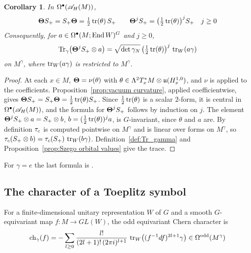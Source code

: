 \documentclass[11pt]{amsart}
\theoremstyle{plain}
\newtheorem{corollary}[theorem]{Corollary}
\theoremstyle{definition}
\theoremstyle{remark}
\begin{document}
\begin{corollary}\label{cor:vacuum curvature}
In $\Omega^\bullet({\mathscr{A}}_H(M))$,
\[ \boldsymbol{\Theta} S_+=S_+\boldsymbol{\Theta}=\tfrac12\operatorname{tr}(\theta)\,S_+\qquad \boldsymbol{\Theta}^jS_+=\bigl(\tfrac12\operatorname{tr}(\theta)\bigr)^jS_+\quad j\ge0\]
Consequently, for $a\in\Omega^\bullet(M;\operatorname{End} W)^G$ and $j\ge0$,
\[ \operatorname{Tr}_\gamma\bigl(\boldsymbol{\Theta}^jS_+\otimes a\bigr)=\sqrt{\det\gamma_N}\,\bigl(\tfrac12\operatorname{tr}(\theta)\bigr)^j\,\operatorname{tr}_W(a\gamma)\]
on $M^\gamma$, where $\operatorname{tr}_W(a\gamma)$ is restricted to $M^\gamma$.
\end{corollary}
\begin{proof}
At each $x\in M$, $\boldsymbol{\Theta}=\nu(\theta)$ with $\theta\in\Lambda^2T^*_xM\otimes\mathfrak{u}(H^{1,0}_x)$, and $\nu$ is applied to the coefficients.
Proposition~\ref{prop:vacuum curvature}, applied coefficientwise, gives $\boldsymbol{\Theta} S_+=S_+\boldsymbol{\Theta}=\frac12\operatorname{tr}(\theta)S_+$.
Since $\frac12\operatorname{tr}(\theta)$ is a scalar $2$-form, it is central in $\Omega^\bullet({\mathscr{A}}_H(M))$, and the formula for $\boldsymbol{\Theta}^jS_+$ follows by induction on $j$.
The element $\boldsymbol{\Theta}^jS_+\otimes a=S_+\otimes b$, $b=(\frac12\operatorname{tr}(\theta))^ja$, is $G$-invariant, since $\theta$ and $a$ are.
By definition  $\tau_{c}$ is computed pointwise on $M^\gamma$ and is linear over forms on $M^\gamma$, so $\tau_{c}(S_+\otimes b)=\tau_{c}(S_+)\,\operatorname{tr}_W(b\gamma)$.
Definition~\ref{def:Tr_gamma} and Proposition~\ref{prop:Szego orbital values} give the trace.

\end{proof}

For $\gamma=e$ the last formula is \cite[Corollary~7.4]{GvE20}.

\subsection{The character of a Toeplitz symbol}\label{sec:Toeplitz character}

For a finite-dimensional unitary representation $W$ of $G$ and a smooth $G$-equivariant map $f:M\to GL(W)$, the odd equivariant Chern character is 
\[ \operatorname{ch}_\gamma(f)=-\sum_{l\ge0}\frac{l!}{(2l+1)!\,(2\pi i)^{l+1}}\,\operatorname{tr}_W\bigl((f^{-1}df)^{2l+1}\gamma\bigr)\in\Omega^{\mathrm{odd}}(M^\gamma)\]
\end{document}
